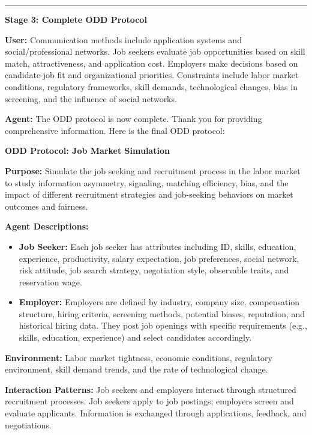 \documentclass{article}
\theoremstyle{definition}
\theoremstyle{theorem}
\theoremstyle{proof}
\theoremstyle{remark}
\begin{document}
\begin{tcolorbox}
\vspace{1em}
\hrule
\vspace{1em}

\textbf{Stage 3: Complete ODD Protocol}

\textbf{User:} Communication methods include application systems and social/professional networks. Job seekers evaluate job opportunities based on skill match, attractiveness, and application cost. Employers make decisions based on candidate-job fit and organizational priorities. Constraints include labor market conditions, regulatory frameworks, skill demands, technological changes, bias in screening, and the influence of social networks.

\textbf{Agent:} The ODD protocol is now complete. Thank you for providing comprehensive information. Here is the final ODD protocol:

\begin{tcolorbox}[
    colback=gray!5,
    colframe=gray!40!black,
    boxrule=0.3mm,
    arc=1mm
]
\textbf{ODD Protocol: Job Market Simulation}

\textbf{Purpose:} Simulate the job seeking and recruitment process in the labor market to study information asymmetry, signaling, matching efficiency, bias, and the impact of different recruitment strategies and job-seeking behaviors on market outcomes and fairness.

\textbf{Agent Descriptions:}
\begin{itemize}
    \item \textbf{Job Seeker:} Each job seeker has attributes including ID, skills, education, experience, productivity, salary expectation, job preferences, social network, risk attitude, job search strategy, negotiation style, observable traits, and reservation wage.
    \item \textbf{Employer:} Employers are defined by industry, company size, compensation structure, hiring criteria, screening methods, potential biases, reputation, and historical hiring data. They post job openings with specific requirements (e.g., skills, education, experience) and select candidates accordingly.
\end{itemize}

\textbf{Environment:}
Labor market tightness, economic conditions, regulatory environment, skill demand trends, and the rate of technological change.

\textbf{Interaction Patterns:}
Job seekers and employers interact through structured recruitment processes. Job seekers apply to job postings; employers screen and evaluate applicants. Information is exchanged through applications, feedback, and negotiations.


\end{tcolorbox}
\end{tcolorbox}
\end{document}
